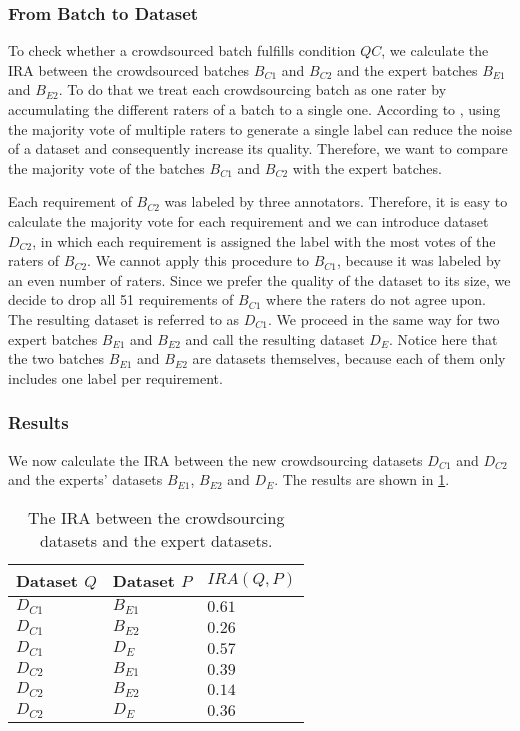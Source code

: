 \subsubsection{From Batch to Dataset}
To check whether a crowdsourced batch fulfills condition $QC$, we calculate the \ac{IRA} between the crowdsourced batches $B_{C1}$ and $B_{C2}$ and the expert batches $B_{E1}$ and $B_{E2}$.
To do that we treat each crowdsourcing batch as one rater by accumulating the different raters of a batch to a single one.
According to \textcite{Nowak:2010}, using the majority vote of multiple raters to generate a single label can reduce the noise of a dataset and consequently increase its quality.
Therefore, we want to compare the majority vote of the batches $B_{C1}$ and $B_{C2}$ with the expert batches.

Each requirement of $B_{C2}$ was labeled by three annotators.
Therefore, it is easy to calculate the majority vote for each requirement and we can introduce dataset $D_{C2}$, in which each requirement is assigned the label with the most votes of the raters of $B_{C2}$.
We cannot apply this procedure to $B_{C1}$, because it was labeled by an even number of raters.
Since we prefer the quality of the dataset to its size, we decide to drop all 51 requirements of $B_{C1}$ where the raters do not agree upon.
The resulting dataset is referred to as $D_{C1}$.
We proceed in the same way for two expert batches $B_{E1}$ and $B_{E2}$ and call the resulting dataset $D_{E}$.
Notice here that the two batches $B_{E1}$ and $B_{E2}$ are datasets themselves, because each of them only includes one label per requirement.

\subsubsection{Results}
We now calculate the \ac{IRA} between the new crowdsourcing datasets $D_{C1}$ and $D_{C2}$ and the experts' datasets $B_{E1}$, $B_{E2}$ and $D_{E}$.
The results are shown in \cref{tab:study:objects:crowdsourcing:batches:IRA:majority}.
\begin{table}[htpb]
    \centering
    \begin{tabular}{l l l}
        \toprule
        Dataset $Q$ & Dataset $P$ & $IRA(Q, P)$ \\
        \midrule
        $D_{C1}$ & $B_{E1}$ & $0.61$\\
        $D_{C1}$ & $B_{E2}$ & $0.26$\\
        $D_{C1}$ & $D_{E}$ & $0.57$\\
        $D_{C2}$ & $B_{E1}$ & $0.39$\\
        $D_{C2}$ & $B_{E2}$ & $0.14$\\
        $D_{C2}$ & $D_{E}$ & $0.36$\\
        \bottomrule
    \end{tabular}
    \caption[Inter rater agreement between crowdsourcing datasets and expert datasets]{The \ac{IRA} between the crowdsourcing datasets and the expert datasets.}\label{tab:study:objects:crowdsourcing:batches:IRA:majority}
\end{table}

